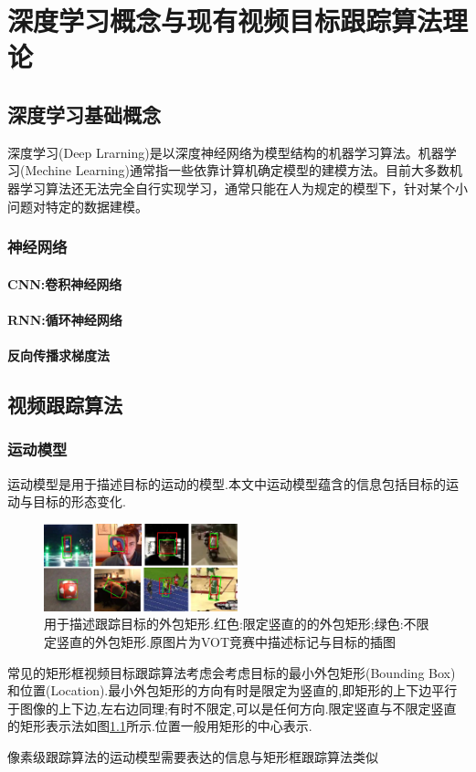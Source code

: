 \chapter{深度学习概念与现有视频目标跟踪算法理论}
\section{深度学习基础概念}
深度学习(Deep Lrarning)是以深度神经网络为模型结构的机器学习算法\supercite{deng2014deep}。机器学习(Mechine Learning)通常指一些依靠计算机确定模型的建模方法。目前大多数机器学习算法还无法完全自行实现学习，通常只能在人为规定的模型下，针对某个小问题对特定的数据建模。
\subsection{神经网络}
\subsubsection{CNN:卷积神经网络}
\subsubsection{RNN:循环神经网络}
\subsubsection{反向传播求梯度法}

\section{视频跟踪算法}
\subsection{运动模型}
运动模型是用于描述目标的运动的模型.本文中运动模型蕴含的信息包括目标的运动与目标的形态变化.
\par
\begin{figure}[htbp!]
    \centering
    \includegraphics[width = 0.5\textwidth]{chap/img/overlap_examples.pdf}
    \caption{用于描述跟踪目标的外包矩形.红色:限定竖直的的外包矩形;绿色:不限定竖直的外包矩形.原图片为VOT竞赛中描述标记与目标的插图\supercite{VOT_TPAMI}}\label{fig:bunding_boxes}
\end{figure}
\par
常见的矩形框视频目标跟踪算法考虑会考虑目标的最小外包矩形(Bounding Box)和位置(Location).最小外包矩形的方向有时是限定为竖直的,即矩形的上下边平行于图像的上下边,左右边同理;有时不限定,可以是任何方向.限定竖直与不限定竖直的矩形表示法如图\ref{fig:bunding_boxes}所示.位置一般用矩形的中心表示.
\par
像素级跟踪算法的运动模型需要表达的信息与矩形框跟踪算法类似

